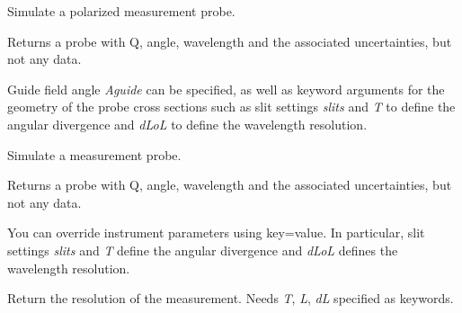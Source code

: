 \documentclass[letterpaper,10pt,english]{sphinxmanual}
\begin{document}
\begin{fulllineitems}
\begin{fulllineitems}
\label{api/snsdata:refl1d.snsdata.Magnetic.load}
\end{fulllineitems}


\begin{fulllineitems}
\label{api/snsdata:refl1d.snsdata.Magnetic.magnetic_probe}
Simulate a polarized measurement probe.

Returns a probe with Q, angle, wavelength and the associated
uncertainties, but not any data.

Guide field angle \emph{Aguide} can be specified, as well as keyword
arguments for the geometry of the probe cross sections such as
slit settings \emph{slits} and \emph{T} to define the angular divergence
and \emph{dLoL} to define the wavelength resolution.

\end{fulllineitems}


\begin{fulllineitems}
\label{api/snsdata:refl1d.snsdata.Magnetic.probe}
Simulate a measurement probe.

Returns a probe with Q, angle, wavelength and the associated
uncertainties, but not any data.

You can override instrument parameters using key=value.
In particular, slit settings \emph{slits} and \emph{T} define
the angular divergence and \emph{dLoL} defines the wavelength
resolution.

\end{fulllineitems}


\begin{fulllineitems}
\label{api/snsdata:refl1d.snsdata.Magnetic.resolution}
Return the resolution of the measurement.  Needs \emph{T}, \emph{L}, \emph{dL}
specified as keywords.

\end{fulllineitems}


\end{fulllineitems}
\end{document}

